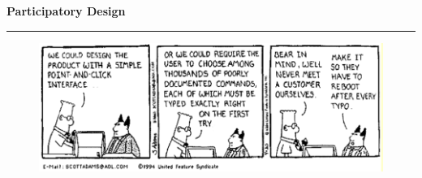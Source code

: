 \documentclass[pdf]{beamer}
\begin{document}
\begin{frame}
\vspace{8mm}
\textcolor{myBlue}{\textbf{\Large{Participatory Design}}}

\textcolor{red}{\rule{10cm}{1mm}}

\begin{figure}[b]
    \includegraphics[scale = 0.5]{moro1.PNG}
\end{figure}
\end{frame}
\end{document}
